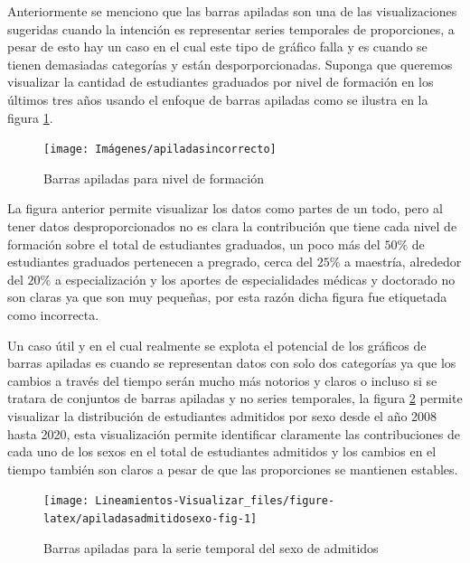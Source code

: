 \documentclass[
]{book}
\begin{document}
Anteriormente se menciono que las barras apiladas son una de las visualizaciones sugeridas cuando la intención es representar series temporales de proporciones, a pesar de esto hay un caso en el cual este tipo de gráfico falla y es cuando se tienen demasiadas categorías y están desporporcionadas. Suponga que queremos visualizar la cantidad de estudiantes graduados por nivel de formación en los últimos tres años usando el enfoque de barras apiladas como se ilustra en la figura \ref{fig:apiladasincorrecto-fig}.

\begin{figure}

{\centering \texttt{[image: Imágenes/apiladasincorrecto]} 

}

\caption{Barras apiladas para nivel de formación}\label{fig:apiladasincorrecto-fig}
\end{figure}

La figura anterior permite visualizar los datos como partes de un todo, pero al tener datos desproporcionados no es clara la contribución que tiene cada nivel de formación sobre el total de estudiantes graduados, un poco más del \(50\%\) de estudiantes graduados pertenecen a pregrado, cerca del \(25\%\) a maestría, alrededor del \(20\%\) a especialización y los aportes de especialidades médicas y doctorado no son claras ya que son muy pequeñas, por esta razón dicha figura fue etiquetada como incorrecta.

Un caso útil y en el cual realmente se explota el potencial de los gráficos de barras apiladas es cuando se representan datos con solo dos categorías ya que los cambios a través del tiempo serán mucho más notorios y claros o incluso si se tratara de conjuntos de barras apiladas y no series temporales, la figura \ref{fig:apiladasadmitidosexo-fig} permite visualizar la distribución de estudiantes admitidos por sexo desde el año 2008 hasta 2020, esta visualización permite identificar claramente las contribuciones de cada uno de los sexos en el total de estudiantes admitidos y los cambios en el tiempo también son claros a pesar de que las proporciones se mantienen estables.

\begin{figure}

{\centering \texttt{[image: Lineamientos-Visualizar\_files/figure-latex/apiladasadmitidosexo-fig-1]} 

}

\caption{Barras apiladas para la serie temporal del sexo de admitidos}\label{fig:apiladasadmitidosexo-fig}
\end{figure}
\end{document}
